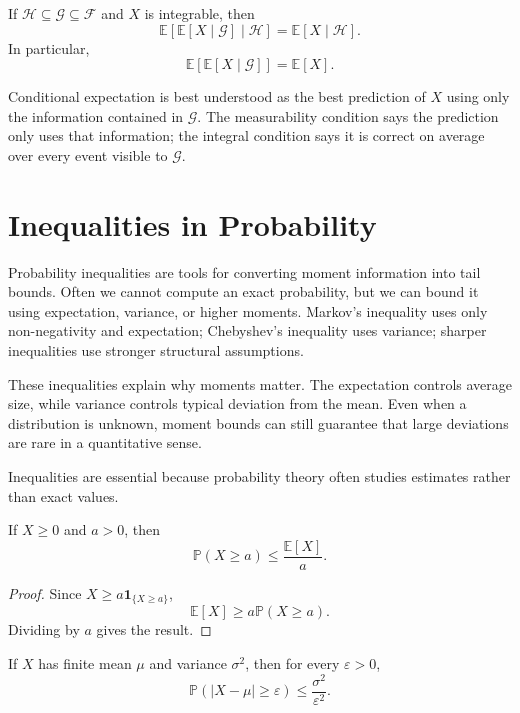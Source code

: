 \begin{theorem}
If $\mathcal{H}\subseteq\mathcal{G}\subseteq\mathcal{F}$ and $X$ is integrable, then
\[
    \mathbb{E}[\mathbb{E}[X\mid\mathcal{G}]\mid\mathcal{H}]=\mathbb{E}[X\mid\mathcal{H}].
\]
In particular,
\[
    \mathbb{E}[\mathbb{E}[X\mid\mathcal{G}]]=\mathbb{E}[X].
\]
\end{theorem}

\begin{remark}
Conditional expectation is best understood as the best prediction of $X$ using only the information contained in $\mathcal{G}$. The measurability condition says the prediction only uses that information; the integral condition says it is correct on average over every event visible to $\mathcal{G}$.
\end{remark}

\section{Inequalities in Probability}


Probability inequalities are tools for converting moment information into tail bounds. Often we cannot compute an exact probability, but we can bound it using expectation, variance, or higher moments. Markov's inequality uses only non-negativity and expectation; Chebyshev's inequality uses variance; sharper inequalities use stronger structural assumptions.

These inequalities explain why moments matter. The expectation controls average size, while variance controls typical deviation from the mean. Even when a distribution is unknown, moment bounds can still guarantee that large deviations are rare in a quantitative sense.

Inequalities are essential because probability theory often studies estimates rather than exact values.

\begin{theorem}
If $X\geq 0$ and $a>0$, then
\[
    \mathbb{P}(X\geq a)\leq \frac{\mathbb{E}[X]}{a}.
\]
\end{theorem}

\begin{proof}
Since $X\geq a\mathbf{1}_{\{X\geq a\}}$,
\[
    \mathbb{E}[X]\geq a\mathbb{P}(X\geq a).
\]
Dividing by $a$ gives the result.
\end{proof}

\begin{theorem}
If $X$ has finite mean $\mu$ and variance $\sigma^2$, then for every $\varepsilon>0$,
\[
    \mathbb{P}(|X-\mu|\geq\varepsilon)\leq\frac{\sigma^2}{\varepsilon^2}.
\]
\end{theorem}



